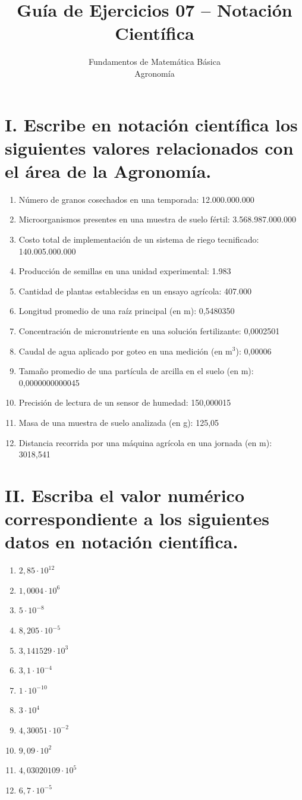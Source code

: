 \documentclass[12pt]{article}
\title{Guía de Ejercicios 07 – Notación Científica}
\author{Fundamentos de Matemática Básica \\ Agronomía}
\date{}
\begin{document}
	
	\maketitle
	
	\section*{I. Escribe en notación científica los siguientes valores relacionados con el área de la Agronomía.}
	
	\begin{enumerate}
		\item Número de granos cosechados en una temporada: 12.000.000.000
		\item Microorganismos presentes en una muestra de suelo fértil: 3.568.987.000.000
		\item Costo total de implementación de un sistema de riego tecnificado: 140.005.000.000
		\item Producción de semillas en una unidad experimental: 1.983
		\item Cantidad de plantas establecidas en un ensayo agrícola: 407.000
		\item Longitud promedio de una raíz principal (en m): 0,5480350
		\item Concentración de micronutriente en una solución fertilizante: 0,0002501
		\item Caudal de agua aplicado por goteo en una medición (en m$^3$): 0,00006
		\item Tamaño promedio de una partícula de arcilla en el suelo (en m): 0,0000000000045
		\item Precisión de lectura de un sensor de humedad: 150,000015
		\item Masa de una muestra de suelo analizada (en g): 125,05
		\item Distancia recorrida por una máquina agrícola en una jornada (en m): 3018,541
	\end{enumerate}
	
	\section*{II. Escriba el valor numérico correspondiente a los siguientes datos en notación científica.}
	
	\begin{enumerate}
		\item $2{,}85 \cdot 10^{12}$
		\item $1{,}0004 \cdot 10^6$
		\item $5 \cdot 10^{-8}$
		\item $8{,}205 \cdot 10^{-5}$
		\item $3{,}141529 \cdot 10^3$
		\item $3{,}1 \cdot 10^{-4}$
		\item $1 \cdot 10^{-10}$
		\item $3 \cdot 10^4$
		\item $4{,}30051 \cdot 10^{-2}$
		\item $9{,}09 \cdot 10^2$
		\item $4{,}03020109 \cdot 10^5$
		\item $6{,}7 \cdot 10^{-5}$
	\end{enumerate}
	
\end{document}
